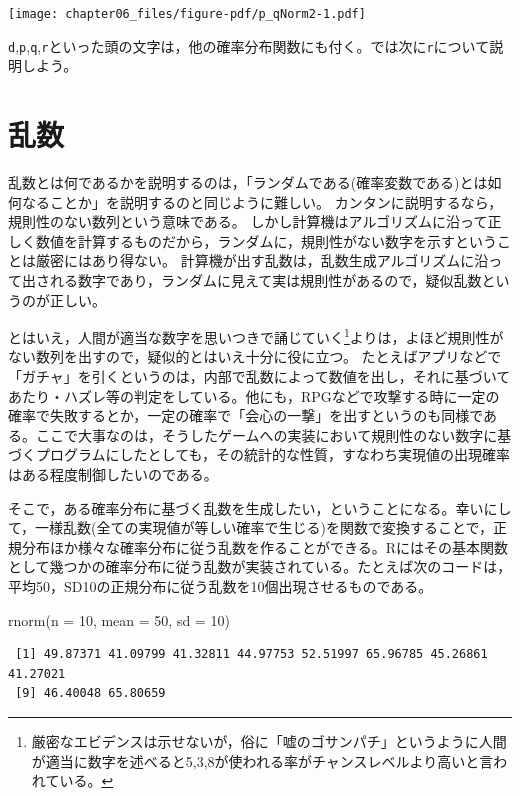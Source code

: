 \documentclass[
  a4paper,
]{ltjsbook}
\newenvironment{Shaded}{\begin{snugshade}}{\end{snugshade}}
\newcommand{\AttributeTok}[1]{\textcolor[rgb]{0.40,0.45,0.13}{#1}}
\newcommand{\DecValTok}[1]{\textcolor[rgb]{0.68,0.00,0.00}{#1}}
\newcommand{\FunctionTok}[1]{\textcolor[rgb]{0.28,0.35,0.67}{#1}}
\newcommand{\NormalTok}[1]{\textcolor[rgb]{0.00,0.23,0.31}{#1}}
\begin{document}
\texttt{[image: chapter06\_files/figure-pdf/p\_qNorm2-1.pdf]}

\texttt{d},\texttt{p},\texttt{q},\texttt{r}といった頭の文字は，他の確率分布関数にも付く。では次に\texttt{r}について説明しよう。

\section{乱数}\label{ux4e71ux6570}

乱数とは何であるかを説明するのは，「ランダムである(確率変数である)とは如何なることか」を説明するのと同じように難しい。
カンタンに説明するなら，規則性のない数列という意味である。
しかし計算機はアルゴリズムに沿って正しく数値を計算するものだから，ランダムに，規則性がない数字を示すということは厳密にはあり得ない。
計算機が出す乱数は，乱数生成アルゴリズムに沿って出される数字であり，ランダムに見えて実は規則性があるので，疑似乱数というのが正しい。

とはいえ，人間が適当な数字を思いつきで誦じていく\footnote{厳密なエビデンスは示せないが，俗に「嘘のゴサンパチ」というように人間が適当に数字を述べると5,3,8が使われる率がチャンスレベルより高いと言われている。}よりは，よほど規則性がない数列を出すので，疑似的とはいえ十分に役に立つ。
たとえばアプリなどで「ガチャ」を引くというのは，内部で乱数によって数値を出し，それに基づいてあたり・ハズレ等の判定をしている。他にも，RPGなどで攻撃する時に一定の確率で失敗するとか，一定の確率で「会心の一撃」を出すというのも同様である。ここで大事なのは，そうしたゲームへの実装において規則性のない数字に基づくプログラムにしたとしても，その統計的な性質，すなわち実現値の出現確率はある程度制御したいのである。

そこで，ある確率分布に基づく乱数を生成したい，ということになる。幸いにして，一様乱数(全ての実現値が等しい確率で生じる)を関数で変換することで，正規分布ほか様々な確率分布に従う乱数を作ることができる。Rにはその基本関数として幾つかの確率分布に従う乱数が実装されている。たとえば次のコードは，平均50，SD10の正規分布に従う乱数を10個出現させるものである。

\begin{Shaded}
\begin{Highlighting}[]
\FunctionTok{rnorm}\NormalTok{(}\AttributeTok{n =} \DecValTok{10}\NormalTok{, }\AttributeTok{mean =} \DecValTok{50}\NormalTok{, }\AttributeTok{sd =} \DecValTok{10}\NormalTok{)}
\end{Highlighting}
\end{Shaded}

\begin{verbatim}
 [1] 49.87371 41.09799 41.32811 44.97753 52.51997 65.96785 45.26861 41.27021
 [9] 46.40048 65.80659
\end{verbatim}
\end{document}
